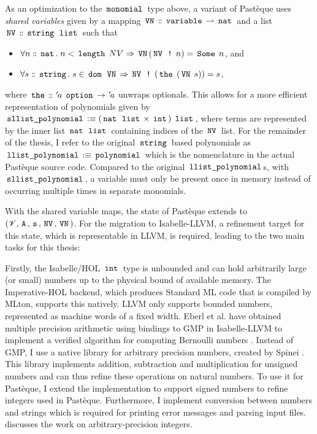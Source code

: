 As an optimization to the $\,\text{\ttfamily monomial}\,$ type above, a variant of Pastèque uses \textit{shared variables} given by a mapping $\,\text{\ttfamily VN}\, \mathrel{\mathord{:}\mkern-1.2mu\mathord{:}} \,\text{\ttfamily variable}\, \rightharpoonup \,\text{\ttfamily nat}\,$ and a list $\,\text{\ttfamily NV}\, \mathrel{\mathord{:}\mkern-1.2mu\mathord{:}} \,\text{\ttfamily string}\, \; \,\text{\ttfamily list}\,$  such that
\begin{itemize}
	\item $\forall n \mathrel{\mathord{:}\mkern-1.2mu\mathord{:}} \,\text{\ttfamily nat}\,. \; n < \,\text{\ttfamily length}\, \; NV \Rightarrow \,\text{\ttfamily VN}\, (\,\text{\ttfamily NV}\, \; \,\text{\ttfamily !}\, \; n) = \,\text{\ttfamily Some}\, \; n$, and
	\item $\forall s \mathrel{\mathord{:}\mkern-1.2mu\mathord{:}} \,\text{\ttfamily string}\,. \; s \in \,\text{\ttfamily dom}\, \; \,\text{\ttfamily VN}\, \Rightarrow \,\text{\ttfamily NV}\, \; \,\text{\ttfamily !}\, \; (\,\text{\ttfamily the}\, \; (\,\text{\ttfamily VN}\, \; s)) = s$,
\end{itemize}
where $\,\text{\ttfamily the}\, \mathrel{\mathord{:}\mkern-1.2mu\mathord{:}} {\mskip2mu '\mskip-2mua} \; \,\text{\ttfamily option}\, \rightarrow {\mskip2mu '\mskip-2mua}$ unwraps optionals.
This allows for a more efficient representation of polynomials given by $\,\text{\ttfamily sllist\_polynomial}\, :\equiv (\,\text{\ttfamily nat}\, \; \,\text{\ttfamily list}\, \times \,\text{\ttfamily int}\,) \; \,\text{\ttfamily list}\,$, where terms are represented by the inner list $\,\text{\ttfamily nat}\, \; \,\text{\ttfamily list}\,$ containing indices of the $\,\text{\ttfamily NV}\,$ list.
For the remainder of the thesis, I refer to the original $\,\text{\ttfamily string}\,$ based polynomials as $\,\text{\ttfamily llist\_polynomial}\,  :\equiv \,\text{\ttfamily polynomial}\,$ which is the nomenclature in the actual Pastèque source code.
Compared to the original $\,\text{\ttfamily llist\_polynomial}\,$s, with $\,\text{\ttfamily sllist\_polynomial}\,$, a variable must only be present once in memory instead of occurring multiple times in separate monomials.

With the shared variable maps, the state of Pastèque extends to $(\mathscr{V}, \,\text{\ttfamily A}\,, \,\text{\ttfamily s}\,, \,\text{\ttfamily NV}\,, \,\text{\ttfamily VN}\,)$.
For the migration to Isabelle-LLVM, a refinement target for this state, which is representable in LLVM, is required, leading to the two main tasks for this thesis:

Firstly, the Isabelle/HOL $\,\text{\ttfamily int}\,$ type is unbounded and can hold arbitrarily large (or small) numbers up to the physical bound of available memory.
The Imperative-HOL backend, which produces Standard ML code that is compiled by MLton, supports this natively.
LLVM only supports bounded numbers, represented as machine words of a fixed width.
Eberl et al. have obtained multiple precision arithmetic using bindings to GMP \cite{gmp} in Isabelle-LLVM to implement a verified algorithm for computing Bernoulli numbers \cite{eberl-bernoulli-numbers}.
Instead of GMP, I use a native library for arbitrary precision numbers, created by Spinei \cite{spinei_isabelle_big_integer}.
This library implements addition, subtraction and multiplication for unsigned numbers and can thus refine these operations on natural numbers.
To use it for Pastèque, I extend the implementation to support signed numbers to refine integers used in Pastèque.
Furthermore, I implement conversion between numbers and strings which is required for printing error messages and parsing input files.  discusses the work on arbitrary-precision integers.

